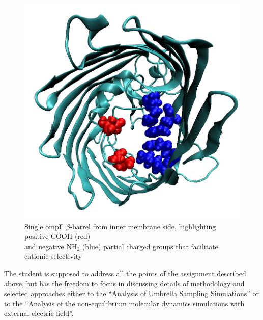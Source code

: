 \documentclass{article}[12pt]
\numberwithin{equation}{section}
\begin{document}
\begin{figure}[H]
	\centering{}
	\captionsetup{justification=centering}
	\includegraphics[scale=0.5]{ompf-charges}
\caption{Single ompF $\beta$-barrel from inner membrane side, highlighting
positive  $\mathrm{COOH}$  (red) \\and negative $\mathrm{NH_2}$ (blue) partial charged groups that facilitate cationic selectivity}
\label{fig:ompF-charges}
\end{figure}
The student is supposed to address all the points of the assignment described above,
but has the freedom to focus in discussing details of methodology and selected
approaches either to the “Analysis of Umbrella Sampling Simulations” or to the
“Analysis of the non-equilibrium molecular dynamics simulations with external electric
field”.


\end{document}
